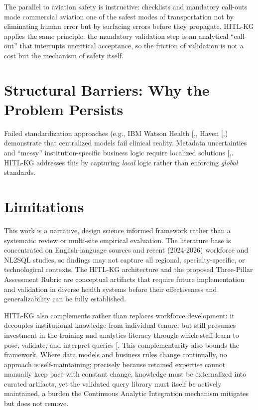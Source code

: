\documentclass[
  american,
  11pt,
  letterpaper,
  oneside  ,captions=tableheading
]{scrartcl}
\begin{document}
The parallel to aviation safety is instructive: checklists and mandatory
call-outs made commercial aviation one of the safest modes of
transportation not by eliminating human error but by surfacing errors
before they propagate. HITL-KG applies the same principle: the mandatory
validation step is an analytical ``call-out'' that interrupts uncritical
acceptance, so the friction of validation is not a cost but the
mechanism of safety itself.

\section{Structural Barriers: Why the Problem
Persists}\label{structural-barriers-why-the-problem-persists}

Failed standardization approaches (e.g., IBM Watson Health
{[},\citeproc{ref-strickland2019}{84}{]},
Haven
{[},\citeproc{ref-acchiardo2021}{86}{]})
demonstrate that centralized models fail clinical reality. Metadata
uncertainties and ``messy'' institution-specific business logic require
localized solutions
{[},\citeproc{ref-yang2020}{87}{]}. HITL-KG
addresses this by capturing \emph{local} logic rather than enforcing
\emph{global} standards.

\section{Limitations}\label{limitations}

This work is a narrative, design science informed framework rather than
a systematic review or multi-site empirical evaluation. The literature
base is concentrated on English-language sources and recent (2024-2026)
workforce and NL2SQL studies, so findings may not capture all regional,
specialty-specific, or technological contexts. The HITL-KG architecture
and the proposed Three-Pillar Assessment Rubric are conceptual artifacts
that require future implementation and validation in diverse health
systems before their effectiveness and generalizability can be fully
established.

HITL-KG also complements rather than replaces workforce development: it
decouples institutional knowledge from individual tenure, but still
presumes investment in the training and analytics literacy through which
staff learn to pose, validate, and interpret queries
{[}\citeproc{ref-konrad2022}{20}{]}. This complementarity also bounds
the framework. Where data models and business rules change continually,
no approach is self-maintaining; precisely because retained expertise
cannot manually keep pace with constant change, knowledge must be
externalized into curated artifacts, yet the validated query library
must itself be actively maintained, a burden the Continuous Analytic
Integration mechanism mitigates but does not remove.
\end{document}
